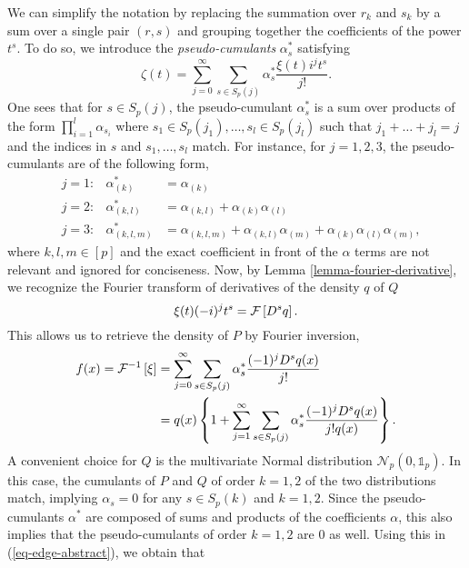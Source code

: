 We can simplify the notation by replacing the summation over $r_k$ and $s_k$ by a sum over a single pair $(r, s)$ and grouping together the coefficients of the power $t^s$. To do so, we introduce the \textit{pseudo-cumulants} $\alpha^*_s$ satisfying
\begin{equation} \label{eq-char-expansion}
    \zeta(t) = 
    \sum_{j=0}^\infty 
    \sum_{s \in S_p(j)}
    \alpha^*_s \frac{\xi(t) i^{j} t^{s}}{j!}.
\end{equation}
One sees that for $s \in S_p(j)$, the pseudo-cumulant $\alpha^*_s$ is a sum over products of the form $ \prod_{i=1}^l \alpha_{s_i}$ where $s_1 \in S_p(j_1), \ldots, s_l \in S_p(j_l)$ such that $j_1 + \ldots + j_l = j$ and the indices in $s$ and $s_1, \ldots, s_l$ match. For instance, for $j = 1, 2, 3$, the pseudo-cumulants are of the following form,
\begin{align*}
    &j = 1:& \alpha^*_{(k)} &= \alpha_{(k)} \\
    &j = 2:&\alpha^*_{(k, l)} &= \alpha_{(k, l)} + \alpha_{(k)}\alpha_{(l)}\\
    &j = 3:&\alpha^*_{(k, l, m)} &= \alpha_{(k, l, m)} + \alpha_{(k, l)}\alpha_{(m)} + \alpha_{(k)}\alpha_{(l)}\alpha_{(m)},
\end{align*}
where $k,l,m \in [p]$ and the exact coefficient in front of the $\alpha$ terms are not relevant and ignored for conciseness. Now, by Lemma \ref{lemma-fourier-derivative}, we recognize the Fourier transform of derivatives of the density $q$ of $Q$
\begin{equation*}
    \xi(t) (-i)^{j} t^s  = \mathcal{F} \left[ D^s q \right].
\end{equation*}
This allows us to retrieve the density of $P$ by Fourier inversion,
\begin{align}\label{eq-edge-abstract}
    f(x) = \mathcal{F}^{-1}\left[\xi\right] &= 
    \sum_{j=0}^\infty 
    \sum_{s \in S_p(j)}
    \alpha^*_s \frac{(-1)^j D^s q(x)}{j!}\nonumber\\
    &= 
    q(x) \left\{ 1 + \sum_{j=1}^\infty 
    \sum_{s \in S_p(j)}
    \alpha^*_s \frac{(-1)^j D^s q(x)}{j! q(x)}\right\}.
\end{align}
A convenient choice for $Q$ is the multivariate Normal distribution $\mathcal{N}_p(0, \mathbb{1}_p)$. In this case, the cumulants of $P$ and $Q$ of order $k=1,2$ of the two distributions match, implying $\alpha_s = 0$ for any $s \in S_p(k)$ and $k=1,2$. Since the pseudo-cumulants $\alpha^*$ are composed of sums and products of the coefficients $\alpha$, this also implies that the pseudo-cumulants of order $k=1,2$ are 0 as well. Using this in (\ref{eq-edge-abstract}), we obtain that
